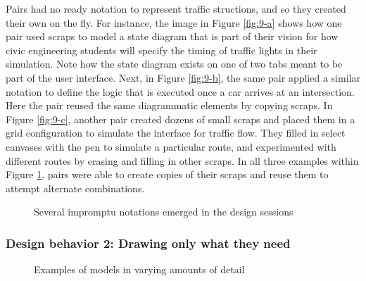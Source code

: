 Pairs had no ready notation to represent traffic structions, and so they created their own on the fly. For instance, the image in Figure \ref{fig:9-a} shows how one pair used scraps to model a state diagram that is part of their vision for how civic engineering students will specify the timing of traffic lights in their simulation. Note how the state diagram exists on one of two tabs meant to be part of the user interface. Next, in Figure \ref{fig:9-b}, the same pair applied a similar notation to define the logic that is executed once a car arrives at an intersection. Here the pair reused the same diagrammatic elements by copying scraps. In Figure \ref{fig:9-c}, another pair created dozens of small scraps and placed them in a grid configuration to simulate the interface for traffic flow. They filled in select canvases with the pen to simulate a particular route, and experimented with different routes by erasing and filling in other scraps. In all three examples within Figure \ref{fig:9}, pairs were able to create copies of their scraps and reuse them to attempt alternate combinations. 

\begin{figure}%
  \centering
   \caption {Several impromptu notations emerged in the design sessions}
   \label{fig:9}
\end{figure}%

\subsubsection{Design behavior 2: Drawing only what they need}
\label{results:22}

\begin{figure}%
  \centering
   \caption {Examples of models in varying amounts of detail}
   \label{fig:8}
\end{figure}%


